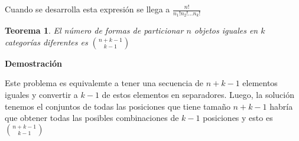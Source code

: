\documentclass[a4paper,12pt]{report}
\newtheorem*{teo}{Teorema}
\begin{document}
Cuando se desarrolla esta expresión se llega a $\frac{n!}{n_1!n_2!\dots n_k!}$

\begin{teo}
 El número de formas de particionar $n$ objetos iguales en $k$ categorías diferentes es ${n+k-1}\choose{k-1}$
\end{teo}

\textbf{Demostración}

Este problema es equivalemte a tener una secuencia de $n+k-1$ elementos iguales y convertir a $k-1$ de estos elementos en separadores. Luego, la solución tenemos el conjuntos de todas las posiciones que tiene tamaño $n+k-1$ habría que obtener todas las posibles combinaciones de $k-1$ posiciones y esto es ${n+k-1}\choose{k-1}$
\end{document}

